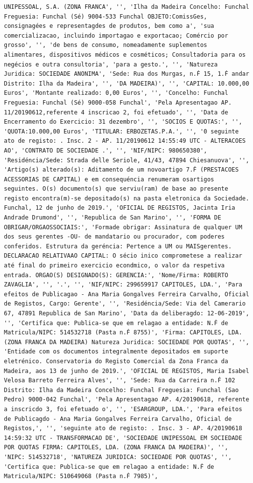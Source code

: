 \documentclass[
  12pt,
]{article}
\begin{document}
\begin{verbatim}
UNIPESSOAL, S.A. (ZONA FRANCA', '', 'Ilha da Madeira Concelho: Funchal Freguesia: Funchal (Sé) 9004-533 Funchal OBJETO:ComissGes, consignagées e representagdes de produtos, bem como a', 'sua comercializacao, incluindo importagao e exportacao; Comércio por grosso', '', 'de bens de consumo, nomeadamente suplementos alimentares, dispositivos médicos e cosméticos; Consultadoria para os negécios e outra consultoria', 'para a gesto.', '', 'Natureza Juridica: SOCIEDADE ANONIMA', 'Sede: Rua dos Murgas, n.Ḟ 15, 1.Ḟ andar Distrito: Ilha da Madeira', '', 'DA MADEIRA)', '', 'CAPITAL: 10.000,00 Euros', 'Montante realizado: 0,00 Euros', '', 'Concelho: Funchal Freguesia: Funchal (Sé) 9000-058 Funchal', 'Pela Apresentagao AP. 11/20190612,referente 4 inscricao 2, foi efetuado', '', 'Data de Encerramento do Exercicio: 31 dezembro', '', 'SOCIOS E QUOTAS:', '', 'QUOTA:10.000,00 Euros', 'TITULAR: ERBOZETAS.P.A.', '', '0 seguinte ato de registo: . Insc. 2 - AP. 11/20190612 14:55:49 UTC - ALTERACOES AO', 'CONTRATO DE SOCIEDADE .', '', 'NIF/NIPC: 980650380', 'Residéncia/Sede: Strada delle Seriole, 41/43, 47894 Chiesanuova', '', 'Artigo(s) alterado(s): Aditamento de um novoartigo 7.Ḟ (PRESTACOES ACESSORIAS DE CAPITAL) e em consequéncia renumeram osartigos seguintes. O(s) documento(s) que serviu(ram) de base ao presente registo encontra(m)-se depositado(s) na pasta eletronica da Sociedade. Funchal, 12 de junho de 2019.', 'OFICIAL DE REGISTOS, Jacinta Iria Andrade Drumond', '', 'Republica de San Marino', '', 'FORMA DE OBRIGAR/ORGAOSSOCIAIS:', 'Formade obrigar: Assinatura de qualquer UM dos seus gerentes -OU- de mandatario ou procurador, com poderes conferidos. Estrutura da geréncia: Pertence a UM ou MAISgerentes. DECLARACAO RELATIVAAO CAPITAL: O sécio inico comprometese a realizar até final do primeiro exercicio econdmico, o valor da respetiva entrada. ORGAO(S) DESIGNADO(S): GERENCIA:', 'Nome/Firma: ROBERTO ZAVAGLIA', '', '.', '', 'NIF/NIPC: 299659917 CAPITOLES, LDA.', 'Para efeitos de Publicagao - Ana Maria Gongalves Ferreira Carvalho, Oficial de Registos, Cargo: Gerente', '', 'Residéncia/Sede: Via del Camerario 67, 47891 Republica de San Marino', 'Data da deliberagdo: 12-06-2019', '', 'Certifica que: Publica-se que em relagao a entidade: N.Ḟ de Matricula/NIPC: 514532718 (Pasta n.Ḟ 8755)', 'Firma: CAPITOLES, LDA. (ZONA FRANCA DA MADEIRA) Natureza Juridica: SOCIEDADE POR QUOTAS', '', 'Entidade com os documentos integralmente depositados em suporte eletrénico. Conservatoria do Registo Comercial da Zona Franca da Madeira, aos 13 de junho de 2019.', 'OFICIAL DE REGISTOS, Maria Isabel Velosa Barreto Ferreira Alves', '', 'Sede: Rua da Carreira n.Ḟ 102 Distrito: Ilha da Madeira Concelho: Funchal Freguesia: Funchal (Sao Pedro) 9000-042 Funchal', 'Pela Apresentagao AP. 4/20190618, referente a inscricdo 3, foi efetuado o', '', 'ESARGROUP, LDA.', 'Para efeitos de Publicagdo - Ana Maria Gongalves Ferreira Carvalho, Oficial de Registos,', '', 'seguinte ato de registo: . Insc. 3 - AP. 4/20190618 14:59:32 UTC - TRANSFORMACAO DE', 'SOCIEDADE UNIPESSOAL EM SOCIEDADE POR QUOTAS FIRMA: CAPITOLES, LDA. (ZONA FRANCA DA MADEIRA)', '', 'NIPC: 514532718', 'NATUREZA JURIDICA: SOCIEDADE POR QUOTAS', '', 'Certifica que: Publica-se que em relagao a entidade: N.Ḟ de Matricula/NIPC: 510649068 (Pasta n.Ḟ 7985)', 
\end{verbatim}
\end{document}
